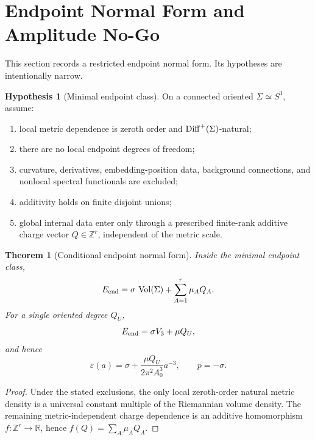 \documentclass[aps,prd,reprint,onecolumn,nofootinbib,superscriptaddress,showkeys]{revtex4-2}
\numberwithin{equation}{section}
\theoremstyle{definition}
\newtheorem{hypothesis}{Hypothesis}[section]
\theoremstyle{plain}
\newtheorem{theorem}{Theorem}[section]
\newcommand{\Sthree}{S^3}
\newcommand{\R}{\mathbb R}
\newcommand{\vol}{\operatorname{Vol}}
\begin{document}
\section{Endpoint Normal Form and Amplitude No-Go}

This section records a restricted endpoint normal form.  Its hypotheses are intentionally narrow.

\begin{hypothesis}[Minimal endpoint class]
On a connected oriented \(\Sigma\simeq\Sthree\), assume:
\begin{enumerate}
\item local metric dependence is zeroth order and \({\rm Diff}^+(\Sigma)\)-natural;
\item there are no local endpoint degrees of freedom;
\item curvature, derivatives, embedding-position data, background connections, and nonlocal spectral functionals are excluded;
\item additivity holds on finite disjoint unions;
\item global internal data enter only through a prescribed finite-rank additive charge vector \(Q\in\mathbb Z^r\), independent of the metric scale.
\end{enumerate}
\end{hypothesis}

\begin{theorem}[Conditional endpoint normal form]
Inside the minimal endpoint class,
\begin{equation}
E_{\rm end}
=
\sigma\,\vol(\Sigma)
+
\sum_{A=1}^r\mu_AQ_A.
\end{equation}
For a single oriented degree \(Q_U\),
\begin{equation}
E_{\rm end}=\sigma V_3+\mu Q_U,
\end{equation}
and hence
\begin{equation}
\varepsilon(a)=\sigma+\frac{\mu Q_U}{2\pi^2A_0^3}a^{-3},
\qquad
p=-\sigma.
\end{equation}
\end{theorem}

\begin{proof}
Under the stated exclusions, the only local zeroth-order natural metric density is a universal constant multiple of the Riemannian volume density.  The remaining metric-independent charge dependence is an additive homomorphism \(f:\mathbb Z^r\to\R\), hence \(f(Q)=\sum_A\mu_AQ_A\).
\end{proof}
\end{document}

